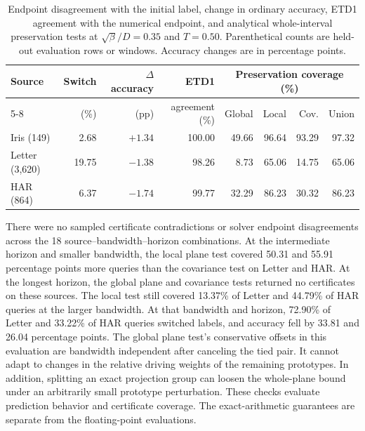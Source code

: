 \begin{table}[htbp]
\centering\small
\setlength{\tabcolsep}{4pt}
\begin{tabular}{lrrrrrrr}
\toprule
Source & Switch & $\Delta$ accuracy & ETD1 & \multicolumn{4}{c}{Preservation coverage (\%)}\\
\cmidrule(lr){5-8}
 & (\%) & (pp) & agreement (\%) & Global & Local & Cov. & Union\\
\midrule
Iris (149) & 2.68 & $+1.34$ & 100.00 & 49.66 & 96.64 & 93.29 & 97.32\\
Letter (3,620) & 19.75 & $-1.38$ & 98.26 & 8.73 & 65.06 & 14.75 & 65.06\\
HAR (864) & 6.37 & $-1.74$ & 99.77 & 32.29 & 86.23 & 30.32 & 86.23\\
\bottomrule
\end{tabular}
\caption{Endpoint disagreement with the initial label, change in ordinary
accuracy, ETD1 agreement with the numerical endpoint, and analytical
whole-interval preservation tests at $\sqrt{\beta}/D=0.35$ and $T=0.50$.
Parenthetical counts are held-out evaluation rows or windows.
Accuracy changes are in percentage points.}
\label{tab:flat-transfer}
\end{table}

There were no sampled certificate contradictions or solver endpoint
disagreements across the 18 source--bandwidth--horizon combinations.
At the intermediate horizon and smaller bandwidth, the local
plane test covered 50.31 and 55.91 percentage points more queries
than the covariance test on Letter and HAR. At the longest horizon,
the global plane and covariance tests returned no certificates on
these sources. The local test still covered 13.37\% of Letter and
44.79\% of HAR queries at the larger bandwidth.
At that bandwidth and horizon, 72.90\% of Letter and 33.22\% of HAR queries switched
labels, and accuracy fell by 33.81 and 26.04 percentage points.
The global plane test's conservative offsets in this evaluation are
bandwidth independent after canceling the tied pair. It cannot
adapt to changes in the relative driving weights of the remaining
prototypes. In addition, splitting an exact projection group
can loosen the whole-plane bound under an arbitrarily small
prototype perturbation. These checks evaluate prediction behavior
and certificate coverage. The exact-arithmetic guarantees are
separate from the floating-point evaluations.

